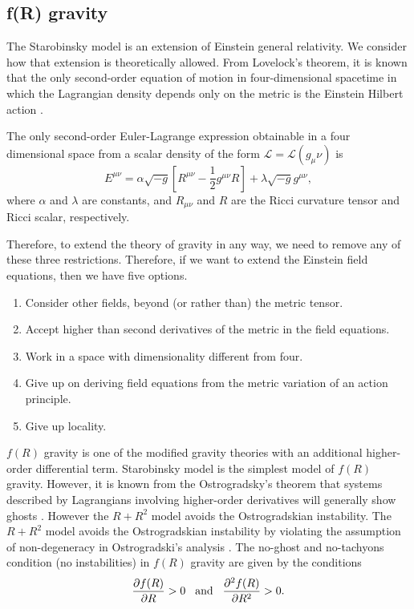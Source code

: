 \documentclass[12pt]{article}
\newcommand{\tcb}[2]{\begin{tcolorbox}[title={\textcolor{white}{#1}}, opacitybacktitle = 0, colframe=white!40!black]#2
\end{tcolorbox}}
\numberwithin{equation}{section}
\begin{document}
\subsection{f(R) gravity}
The Starobinsky model is an extension of Einstein general relativity. We consider how that extension is theoretically allowed. From Lovelock's theorem, it is known that the only second-order equation of motion in four-dimensional spacetime in which the Lagrangian density depends only on the metric is the Einstein Hilbert action \cite{Clifton:2011jh}.
\tcb{Lovelock's theorem}{
    The only second-order Euler-Lagrange expression obtainable in a four dimensional space from a scalar density of the form $\mathcal{L} = \mathcal{L}(g_\mu\nu)$ is
    \begin{equation}
        E^{\mu\nu} = \alpha \sqrt{-g} \left[ R^{\mu\nu} - \frac{1}{2}g^{\mu\nu}R \right] + \lambda\sqrt{-g}g^{\mu\nu},
    \end{equation}
    where $\alpha$ and $\lambda$ are constants, and $R_{\mu\nu}$ and $R$ are the Ricci curvature tensor and Ricci scalar, respectively. 
}
\noindent Therefore, to extend the theory of gravity in any way, we need to remove any of these three restrictions. Therefore, if we want to extend the Einstein field equations, then we have five options.
\begin{enumerate}
    \item Consider other fields, beyond (or rather than) the metric tensor.
    \item Accept higher than second derivatives of the metric in the field equations.
    \item Work in a space with dimensionality different from four.
    \item Give up on deriving field equations from the metric variation of
    an action principle.
    \item Give up locality.
\end{enumerate}
$f(R)$ gravity is one of the modified gravity theories with an additional higher-order differential term. Starobinsky model is the simplest model of $f(R)$ gravity. However, it is known from the Ostrogradsky's theorem that systems described by Lagrangians involving higher-order derivatives will generally show ghosts \cite{Ostrogradsky:1850fid}\cite{Woodard:2015zca}. However the $R + R^2$ model avoids the Ostrogradskian instability. The $R+R^2$ model avoids the Ostrogradskian instability by violating the assumption of non-degeneracy in Ostrogradski's analysis \cite{Woodard:2006nt}. The no-ghost and no-tachyons condition (no instabilities) in $f(R)$ gravity are given by the conditions \cite{DeFelice:2010aj}
\begin{equation}
    \frac{\partial f(R)}{\partial R} > 0\hspace{0.3cm}\textrm{and}\hspace{0.3cm} \frac{\partial^2 f(R)}{\partial R^2} > 0.
\end{equation}
\end{document}
